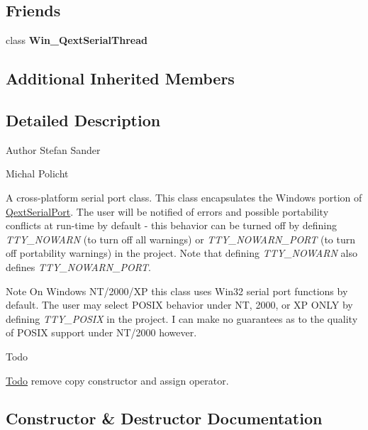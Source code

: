 \subsection*{Friends}
\begin{DoxyCompactItemize}
\item 
\mbox{\label{class_win___qext_serial_port_a8fce0c43e9f2c96af30e69cb4f8047cf}} 
class {\bfseries Win\+\_\+\+Qext\+Serial\+Thread}
\end{DoxyCompactItemize}
\subsection*{Additional Inherited Members}


\subsection{Detailed Description}
\begin{DoxyAuthor}{Author}
Stefan Sander 

Michal Policht
\end{DoxyAuthor}
A cross-\/platform serial port class. This class encapsulates the Windows portion of \mbox{\hyperlink{class_qext_serial_port}{Qext\+Serial\+Port}}. The user will be notified of errors and possible portability conflicts at run-\/time by default -\/ this behavior can be turned off by defining {\itshape T\+T\+Y\+\_\+\+N\+O\+W\+A\+RN} (to turn off all warnings) or {\itshape T\+T\+Y\+\_\+\+N\+O\+W\+A\+R\+N\+\_\+\+P\+O\+RT} (to turn off portability warnings) in the project. Note that defining {\itshape T\+T\+Y\+\_\+\+N\+O\+W\+A\+RN} also defines {\itshape T\+T\+Y\+\_\+\+N\+O\+W\+A\+R\+N\+\_\+\+P\+O\+RT}.

\begin{DoxyNote}{Note}
On Windows N\+T/2000/\+XP this class uses Win32 serial port functions by default. The user may select P\+O\+S\+IX behavior under NT, 2000, or XP O\+N\+LY by defining {\itshape T\+T\+Y\+\_\+\+P\+O\+S\+IX} in the project. I can make no guarantees as to the quality of P\+O\+S\+IX support under N\+T/2000 however.
\end{DoxyNote}
\begin{DoxyRefDesc}{Todo}
\item[\mbox{\hyperlink{todo__todo000002}{Todo}}]remove copy constructor and assign operator. \end{DoxyRefDesc}


\subsection{Constructor \& Destructor Documentation}
\mbox{\label{class_win___qext_serial_port_a3f96ad148dd04e48d2251d85866f2bb7}} 
